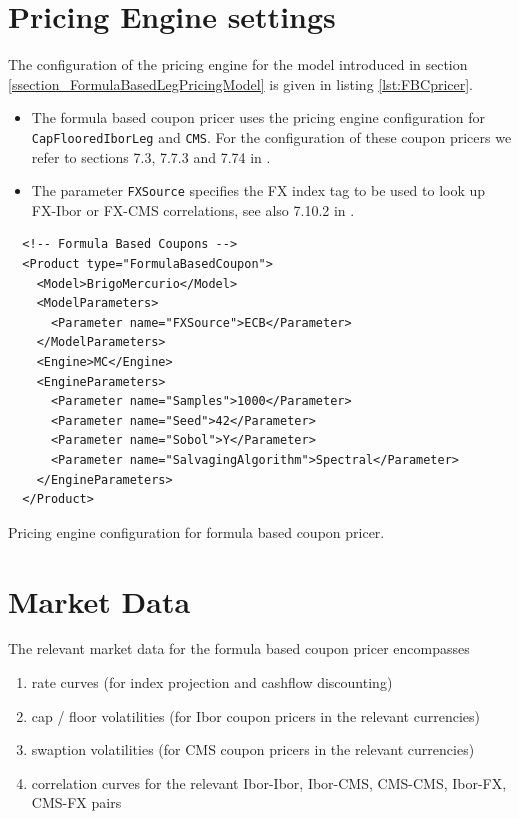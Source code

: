 \documentclass[12pt, a4paper]{article}
\begin{document}
\section{Pricing Engine settings}

The configuration of the pricing engine for the model introduced in section \ref{ssection_FormulaBasedLegPricingModel}
is given in listing \ref{lst:FBCpricer}.

\begin{itemize}
\item The formula based coupon pricer uses the pricing engine configuration for { \tt CapFlooredIborLeg} and {\tt CMS}.
  For the configuration of these coupon pricers we refer to sections 7.3, 7.7.3 and 7.74 in \cite{oreug}.
\item The parameter \verb+FXSource+ specifies the FX index tag to be used to look up FX-Ibor or FX-CMS correlations, see
  also 7.10.2 in \cite{oreug}.
\end{itemize}
%
\begin{listing}
\begin{verbatim}
  <!-- Formula Based Coupons -->
  <Product type="FormulaBasedCoupon">
    <Model>BrigoMercurio</Model>
    <ModelParameters>
      <Parameter name="FXSource">ECB</Parameter>
    </ModelParameters>
    <Engine>MC</Engine>
    <EngineParameters>
      <Parameter name="Samples">1000</Parameter>
      <Parameter name="Seed">42</Parameter>
      <Parameter name="Sobol">Y</Parameter>
      <Parameter name="SalvagingAlgorithm">Spectral</Parameter>
    </EngineParameters>
  </Product>
\end{verbatim}
\caption{Pricing engine configuration for formula based coupon pricer.}
\label{lst:FBCpricer}
\end{listing}
%
\section{Market Data}

The relevant market data for the formula based coupon pricer encompasses

\begin{enumerate}
\item rate curves (for index projection and cashflow discounting)
\item cap / floor volatilities (for Ibor coupon pricers in the relevant currencies)
\item swaption volatilities (for CMS coupon pricers in the relevant currencies)
\item correlation curves for the relevant Ibor-Ibor, Ibor-CMS, CMS-CMS, Ibor-FX, CMS-FX pairs
\end{enumerate}
\end{document}
